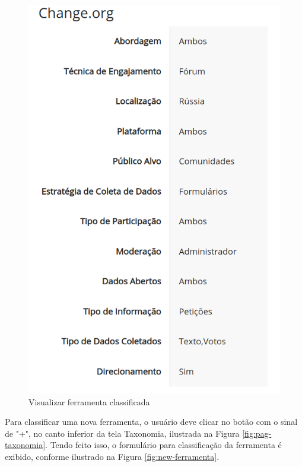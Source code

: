 \begin{figure}[!ht]
    \centering
    \includegraphics[scale=0.20]{./figuras/show-ferramenta.png}
    \caption{Visualizar ferramenta classificada}
    \label{fig:show-ferramenta}
\end{figure}


\par
Para classificar uma nova ferramenta, o usuário deve clicar no botão com o  sinal de "+", no canto inferior da tela Taxonomia, ilustrada na Figura \ref{fig:pag-taxonomia}. Tendo feito isso, o formulário para classificação da ferramenta é exibido, conforme ilustrado na Figura \ref{fig:new-ferramenta}. 

